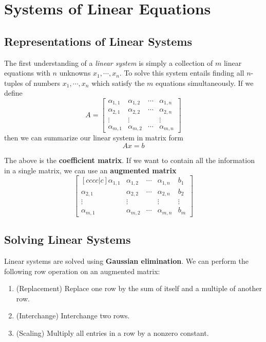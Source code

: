 \chapter{Systems of Linear Equations}
\section{Representations of Linear Systems}
The first understanding of a \textit{linear system} is simply a collection of $m$ linear equations with $n$ unknowns $x_{1}, \cdots, x_{n}$. To solve this system entails finding all $n$-tuples of numbers $x_{1}, \cdots, x_{n}$ which satisfy the $m$ equations simultaneously. If we define 
$$A = \begin{bmatrix}
\alpha_{1, 1} & \alpha_{1, 2} & \cdots & \alpha_{1, n} \\
\alpha_{2, 1} & \alpha_{2, 2} & \cdots & \alpha_{2, n} \\
\vdots & \vdots & & \vdots \\
\alpha_{m, 1} & \alpha_{m, 2} & \cdots & \alpha_{m, n}
\end{bmatrix}$$
then we can summarize our linear system in matrix form
$$Ax = b$$

The above is the \textbf{coefficient matrix}. If we want to contain all the information in a single matrix, we can use an \textbf{augmented matrix} 
$$\begin{bmatrix}[cccc|c]
\alpha_{1, 1} & \alpha_{1, 2} & \cdots & \alpha_{1, n} & b_{1}\\
\alpha_{2, 1} & \alpha_{2, 2} & \cdots & \alpha_{2, n} & b_{2}\\
\vdots & \vdots & & \vdots & \vdots\\
\alpha_{m, 1} & \alpha_{m, 2} & \cdots & \alpha_{m, n} & b_{m}
\end{bmatrix}$$

\section{Solving Linear Systems}
Linear systems are solved using \textbf{Gaussian elimination}. We can perform the following row operation on an augmented matrix:
\begin{enumerate}
	\item (Replacement) Replace one row by the sum of itself and a multiple of another row. 
	\item (Interchange) Interchange two rows. 
	\item (Scaling) Multiply all entries in a row by a nonzero constant. 
\end{enumerate}

